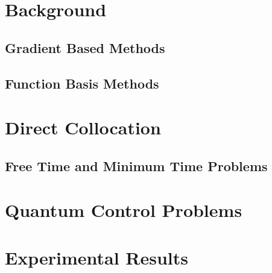\documentclass{article}
\begin{document}
\section{Background}

\subsection{Gradient Based Methods}

\subsection{Function Basis Methods}

\section{Direct Collocation}

\subsection{Free Time and Minimum Time Problems}

\subsection{}

\section{Quantum Control Problems}

\section{Experimental Results}
\end{document}
